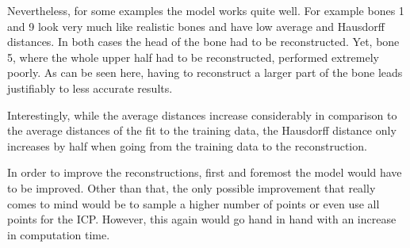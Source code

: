 Nevertheless, for some examples the model works quite well.
For example bones 1 and 9 look very much like realistic bones and have low average and Hausdorff distances. 
In both cases the head of the bone had to be reconstructed. 
Yet, bone 5, where the whole upper half had to be reconstructed, performed extremely poorly. 
As can be seen here, having to reconstruct a larger part of the bone leads justifiably to less accurate results.

Interestingly, while the average distances increase considerably in comparison to the average distances of the fit to the training data, the Hausdorff distance only increases by half when going from the training data to the reconstruction.

In order to improve the reconstructions, first and foremost the model would have to be improved. 
Other than that, the only possible improvement that really comes to mind would be to sample a higher number of points or even use all points for the ICP.
However, this again would go hand in hand with an increase in computation time.
